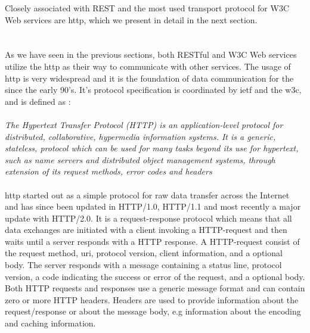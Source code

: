 Closely associated with REST and the most used transport protocol for W3C Web
services are \gls{http}, which we present in detail in the next section.


\section{}

As we have seen in the previous sections, both RESTful and W3C Web services
utilize the \gls{http} as their way to communicate with other services. The
usage of \gls{http} is very widespread and it is the foundation of data
communication for the  since the early 90's. It's protocol
specification is coordinated by \gls{ietf} and the \gls{w3c}, and is defined
as \cite{rfc-2616}:

\paragraph{}
\textit{
    The Hypertext Transfer Protocol (HTTP) is an application-level
    protocol for distributed, collaborative, hypermedia information
    systems. It is a generic, stateless, protocol which can be used for
    many tasks beyond its use for hypertext, such as name servers and
    distributed object management systems, through extension of its
    request methods, error codes and headers
}

\paragraph{}

\gls{http} started out as a simple protocol for raw data transfer across the
Internet and has since been updated in HTTP/1.0, HTTP/1.1 and most recently a
major update with HTTP/2.0. It is a request-response protocol which means that all
data exchanges are initiated with a client invoking a HTTP-request and then
waits until a server responds with a HTTP response. A HTTP-request consist of
the request method, \gls{uri}, protocol version, client information, and a optional
body. The server responds with a message containing a status line, protocol
version, a code indicating the success or error of the request, and a optional
body. Both HTTP requests and responses use a generic message format and can
contain zero or more HTTP headers. Headers are used to provide information about
the request/response or about the message body, e.g information about the encoding
and caching information.

